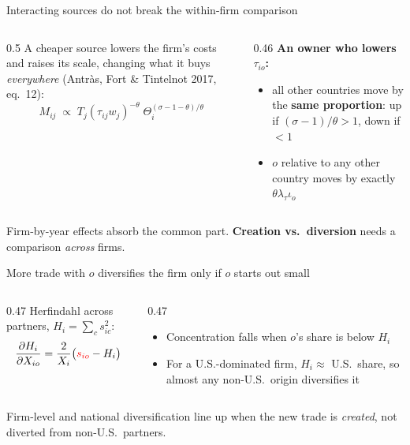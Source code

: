 \documentclass[notes,11pt, aspectratio=169]{beamer}
\begin{document}
\begin{frame}{Interacting sources do not break the within-firm comparison}
\begin{columns}[T]
\begin{column}{0.5\textwidth}
A cheaper source lowers the firm's costs and raises its scale, changing what it buys \emph{everywhere} (Antr\`as, Fort \& Tintelnot 2017, eq.\ 12):
\[
M_{ij}\;\propto\;T_j(\tau_{ij}w_j)^{-\theta}\;\Theta_i^{(\sigma-1-\theta)/\theta}
\]
\end{column}
\begin{column}{0.46\textwidth}
\textbf{An owner who lowers $\tau_{io}$:}
\begin{itemize}\setlength{\itemsep}{4pt}
\item all other countries move by the \textbf{same proportion}: up if $(\sigma-1)/\theta>1$, down if $<1$
\item $o$ relative to any other country moves by exactly $\theta\lambda_\tau\iota_o$
\end{itemize}
\end{column}
\end{columns}
\pause
\vspace{0.2cm}
Firm-by-year effects absorb the common part. \textbf{Creation vs.\ diversion} needs a comparison \emph{across} firms.
\end{frame}


\begin{frame}{More trade with $o$ diversifies the firm only if $o$ starts out small}
\begin{columns}[T]
\begin{column}{0.47\textwidth}
Herfindahl across partners, $H_i=\sum_c s_{ic}^2$:
\[
\frac{\partial H_i}{\partial X_{io}}=\frac{2}{X_i}\big(\textcolor{red}{s_{io}}-H_i\big)
\]
\end{column}
\begin{column}{0.47\textwidth}
\begin{itemize}\setlength{\itemsep}{4pt}
\item Concentration falls when $o$'s share is below $H_i$
\item For a U.S.-dominated firm, $H_i\approx$ U.S.\ share, so almost any non-U.S.\ origin diversifies it
\end{itemize}
\end{column}
\end{columns}
\pause
\vspace{0.3cm}
Firm-level and national diversification line up when the new trade is \emph{created}, not diverted from non-U.S.\ partners.
\end{frame}
\end{document}

